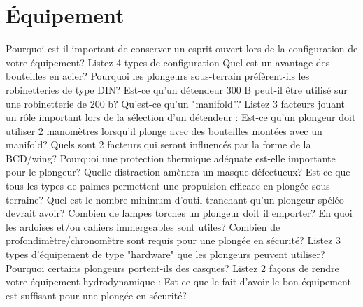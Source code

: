 \documentclass[english,1pt,a4paper]{article}
\begin{document}
	\section{Équipement}

	\begin{outline}
		\1 Pourquoi est-il important de conserver un esprit ouvert lors de la configuration de votre équipement?	\vspace{2cm}
		\1 Listez 4 types de configuration	\vspace{2cm}
		\1 Quel est un avantage des bouteilles en acier?	\vspace{2cm}
		\1 Pourquoi les plongeurs sous-terrain préfèrent-ils les robinetteries de type DIN?	\vspace{2cm}
		\1 Est-ce qu’un détendeur 300 B peut-il être utilisé sur une robinetterie de 200 b?	\vspace{2cm}
		\1 Qu’est-ce qu’un "manifold"?	\vspace{2cm}
		\1 Listez 3 facteurs jouant un rôle important lors de la sélection d’un détendeur :	\vspace{2cm}
		\1 Est-ce qu’un plongeur doit utiliser 2 manomètres lorsqu’il plonge avec des bouteilles montées avec un manifold?	\vspace{2cm}
		\1 Quels sont 2 facteurs qui seront influencés par la forme de la BCD/wing?	\vspace{2cm}
		\1 Pourquoi une protection thermique adéquate est-elle importante pour le plongeur?	\vspace{2cm}
		\1 Quelle distraction amènera un masque défectueux?	\vspace{2cm}
		\1 Est-ce que tous les types de palmes permettent une propulsion efficace en plongée-sous terraine?	\vspace{2cm}
		\1 Quel est le nombre minimum d’outil tranchant qu’un plongeur spéléo devrait avoir?	\vspace{2cm}
		\1 Combien de lampes torches un plongeur doit il emporter?	\vspace{2cm}
		\1 En quoi les ardoises et/ou cahiers immergeables sont utiles?	\vspace{2cm}
		\1 Combien de profondimètre/chronomètre sont requis pour une plongée en sécurité?	\vspace{2cm}
		\1 Listez 3 types d’équipement de type "hardware" que les plongeurs peuvent utiliser?	\vspace{2cm}
		\1 Pourquoi certains plongeurs portent-ils des casques?	\vspace{2cm}
		\1 Listez 2 façons de rendre votre équipement hydrodynamique :	\vspace{2cm}
		\1 Est-ce que le fait d’avoir le bon équipement est suffisant pour une plongée en sécurité?	\vspace{2cm}
	\end{outline}
	\pagebreak	
\end{document}
